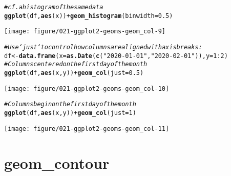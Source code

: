 \documentclass[a4paper,titlepage]{tufte-handout}\usepackage[]{graphicx}\usepackage[]{xcolor}
\makeatletter
\def\maxwidth{ %
  \ifdim\Gin@nat@width>\linewidth
    \linewidth
  \else
    \Gin@nat@width
  \fi
}
\newcommand{\hlnum}[1]{\textcolor[rgb]{0.686,0.059,0.569}{#1}}%
\newcommand{\hlsng}[1]{\textcolor[rgb]{0.192,0.494,0.8}{#1}}%
\newcommand{\hlcom}[1]{\textcolor[rgb]{0.678,0.584,0.686}{\textit{#1}}}%
\newcommand{\hlopt}[1]{\textcolor[rgb]{0,0,0}{#1}}%
\newcommand{\hldef}[1]{\textcolor[rgb]{0.345,0.345,0.345}{#1}}%
\newcommand{\hlkwb}[1]{\textcolor[rgb]{0.69,0.353,0.396}{#1}}%
\newcommand{\hlkwc}[1]{\textcolor[rgb]{0.333,0.667,0.333}{#1}}%
\newcommand{\hlkwd}[1]{\textcolor[rgb]{0.737,0.353,0.396}{\textbf{#1}}}%
\newenvironment{kframe}{%
 \def\at@end@of@kframe{}%
 \ifinner\ifhmode%
  \def\at@end@of@kframe{\end{minipage}}%
  \begin{minipage}{\columnwidth}%
 \fi\fi%
 \def\FrameCommand##1{\hskip\@totalleftmargin \hskip-\fboxsep
 \colorbox{shadecolor}{##1}\hskip-\fboxsep
     \hskip-\linewidth \hskip-\@totalleftmargin \hskip\columnwidth}%
 \MakeFramed {\advance\hsize-\width
   \@totalleftmargin\z@ \linewidth\hsize
   \@setminipage}}%
 {\par\unskip\endMakeFramed%
 \at@end@of@kframe}
\newenvironment{knitrout}{}{} %
\makeatother
\begin{document}
\begin{knitrout}
\begin{kframe}\begin{alltt}
\hlcom{# cf. a histogram of the same data}
\hlkwd{ggplot}\hldef{(df,} \hlkwd{aes}\hldef{(x))} \hlopt{+} \hlkwd{geom_histogram}\hldef{(}\hlkwc{binwidth} \hldef{=} \hlnum{0.5}\hldef{)}
\end{alltt}
\end{kframe}
\texttt{[image: figure/021-ggplot2-geoms-geom\_col-9]} 
\begin{kframe}\begin{alltt}
\hlcom{# Use `just` to control how columns are aligned with axis breaks:}
\hldef{df} \hlkwb{<-} \hlkwd{data.frame}\hldef{(}\hlkwc{x} \hldef{=} \hlkwd{as.Date}\hldef{(}\hlkwd{c}\hldef{(}\hlsng{"2020-01-01"}\hldef{,} \hlsng{"2020-02-01"}\hldef{)),} \hlkwc{y} \hldef{=} \hlnum{1}\hlopt{:}\hlnum{2}\hldef{)}
\hlcom{# Columns centered on the first day of the month}
\hlkwd{ggplot}\hldef{(df,} \hlkwd{aes}\hldef{(x, y))} \hlopt{+} \hlkwd{geom_col}\hldef{(}\hlkwc{just} \hldef{=} \hlnum{0.5}\hldef{)}
\end{alltt}
\end{kframe}
\texttt{[image: figure/021-ggplot2-geoms-geom\_col-10]} 
\begin{kframe}\begin{alltt}
\hlcom{# Columns begin on the first day of the month}
\hlkwd{ggplot}\hldef{(df,} \hlkwd{aes}\hldef{(x, y))} \hlopt{+} \hlkwd{geom_col}\hldef{(}\hlkwc{just} \hldef{=} \hlnum{1}\hldef{)}
\end{alltt}
\end{kframe}
\texttt{[image: figure/021-ggplot2-geoms-geom\_col-11]} 
\end{knitrout}


\section{geom\_contour}
\end{document}
